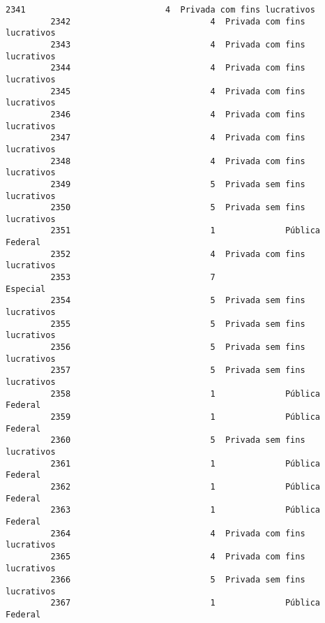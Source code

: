 \documentclass[11pt]{article}
\begin{document}
\begin{Verbatim}[commandchars=\\\{\}]
         2341                            4  Privada com fins lucrativos   
         2342                            4  Privada com fins lucrativos   
         2343                            4  Privada com fins lucrativos   
         2344                            4  Privada com fins lucrativos   
         2345                            4  Privada com fins lucrativos   
         2346                            4  Privada com fins lucrativos   
         2347                            4  Privada com fins lucrativos   
         2348                            4  Privada com fins lucrativos   
         2349                            5  Privada sem fins lucrativos   
         2350                            5  Privada sem fins lucrativos   
         2351                            1              Pública Federal   
         2352                            4  Privada com fins lucrativos   
         2353                            7                     Especial   
         2354                            5  Privada sem fins lucrativos   
         2355                            5  Privada sem fins lucrativos   
         2356                            5  Privada sem fins lucrativos   
         2357                            5  Privada sem fins lucrativos   
         2358                            1              Pública Federal   
         2359                            1              Pública Federal   
         2360                            5  Privada sem fins lucrativos   
         2361                            1              Pública Federal   
         2362                            1              Pública Federal   
         2363                            1              Pública Federal   
         2364                            4  Privada com fins lucrativos   
         2365                            4  Privada com fins lucrativos   
         2366                            5  Privada sem fins lucrativos   
         2367                            1              Pública Federal   
         

\end{Verbatim}
\end{document}

